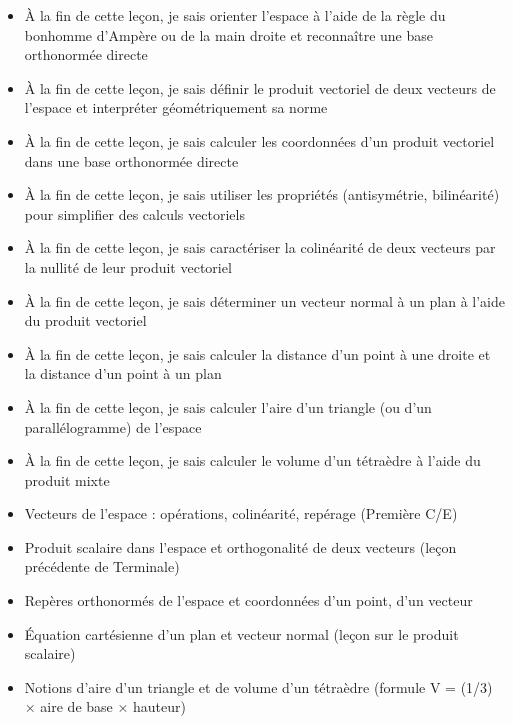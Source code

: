 \documentclass[11pt]{article}
\begin{document}
\begin{objectifs}
\begin{itemize}
\item À la fin de cette leçon, je sais orienter l'espace à l'aide de la règle du bonhomme d'Ampère ou de la main droite et reconnaître une base orthonormée directe
\item À la fin de cette leçon, je sais définir le produit vectoriel de deux vecteurs de l'espace et interpréter géométriquement sa norme
\item À la fin de cette leçon, je sais calculer les coordonnées d'un produit vectoriel dans une base orthonormée directe
\item À la fin de cette leçon, je sais utiliser les propriétés (antisymétrie, bilinéarité) pour simplifier des calculs vectoriels
\item À la fin de cette leçon, je sais caractériser la colinéarité de deux vecteurs par la nullité de leur produit vectoriel
\item À la fin de cette leçon, je sais déterminer un vecteur normal à un plan à l'aide du produit vectoriel
\item À la fin de cette leçon, je sais calculer la distance d'un point à une droite et la distance d'un point à un plan
\item À la fin de cette leçon, je sais calculer l'aire d'un triangle (ou d'un parallélogramme) de l'espace
\item À la fin de cette leçon, je sais calculer le volume d'un tétraèdre à l'aide du produit mixte
\end{itemize}
\end{objectifs}

\begin{prerequis}
\begin{itemize}
\item Vecteurs de l'espace : opérations, colinéarité, repérage (Première C/E)
\item Produit scalaire dans l'espace et orthogonalité de deux vecteurs (leçon précédente de Terminale)
\item Repères orthonormés de l'espace et coordonnées d'un point, d'un vecteur
\item Équation cartésienne d'un plan et vecteur normal (leçon sur le produit scalaire)
\item Notions d'aire d'un triangle et de volume d'un tétraèdre (formule V = (1/3) × aire de base × hauteur)
\end{itemize}
\end{prerequis}
\end{document}
